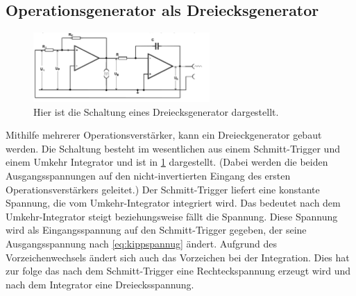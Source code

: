 \subsection{Operationsgenerator als Dreiecksgenerator}
\begin{figure}[h!]
	\centering
	\includegraphics[width = 0.6\textwidth]{../Grafiken/Dreieckgenerator.png}
	\caption{Hier ist die Schaltung eines Dreiecksgenerator dargestellt. \cite{V51} \label{fig:Dreieck}}
\end{figure}
\noindent
Mithilfe mehrerer Operationsverstärker, kann ein Dreieckgenerator gebaut werden.
Die Schaltung besteht im wesentlichen aus einem Schmitt-Trigger und einem Umkehr Integrator und ist in \cref{fig:Dreieck} dargestellt.
(Dabei werden die beiden Ausgangsspannungen auf den nicht-invertierten Eingang des ersten Operationsverstärkers geleitet.)
Der Schmitt-Trigger liefert eine konstante Spannung, die vom Umkehr-Integrator integriert wird.
Das bedeutet nach dem Umkehr-Integrator steigt beziehungsweise fällt die Spannung. 
Diese Spannung wird als Eingangsspannung auf den Schmitt-Trigger gegeben, der seine Ausgangsspannung nach \cref{eq:kippspannug} ändert.
Aufgrund des Vorzeichenwechsels ändert sich auch das Vorzeichen bei der Integration.
Dies hat zur folge das nach dem Schmitt-Trigger eine Rechteckspannung erzeugt wird und nach dem Integrator eine Dreiecksspannung.

